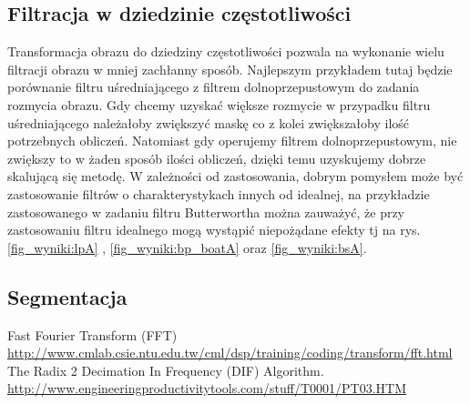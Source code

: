 \documentclass{classrep}
\begin{document}
\subsection{Filtracja w dziedzinie częstotliwości}
Transformacja obrazu do dziedziny częstotliwości pozwala na wykonanie wielu filtracji obrazu w mniej zachłanny sposób. Najlepszym przykładem tutaj będzie porównanie filtru uśredniającego z filtrem dolnoprzepustowym do zadania rozmycia obrazu. Gdy chcemy uzyskać większe rozmycie w przypadku filtru uśredniającego należałoby zwiększyć maskę co z kolei zwiększałoby ilość potrzebnych obliczeń. Natomiast gdy operujemy filtrem dolnoprzepustowym, nie zwiększy to w żaden sposób ilości obliczeń, dzięki temu uzyskujemy dobrze skalującą się metodę. W zależności od zastosowania, dobrym pomysłem może być zastosowanie filtrów o charakterystykach innych od idealnej, na przykładzie zastosowanego w zadaniu filtru Butterwortha można zauważyć, że przy zastosowaniu filtru idealnego mogą wystąpić niepożądane efekty tj na rys. \ref{fig_wyniki:lpA} , \ref{fig_wyniki:bp_boatA} oraz \ref{fig_wyniki:bsA}. 


\subsection{Segmentacja}



\begin{thebibliography}{8}

 Fast Fourier Transform (FFT) \url{http://www.cmlab.csie.ntu.edu.tw/cml/dsp/training/coding/transform/fft.html}
 The Radix 2 Decimation In Frequency (DIF) Algorithm.   \url{http://www.engineeringproductivitytools.com/stuff/T0001/PT03.HTM}

\end{thebibliography}
\end{document}
